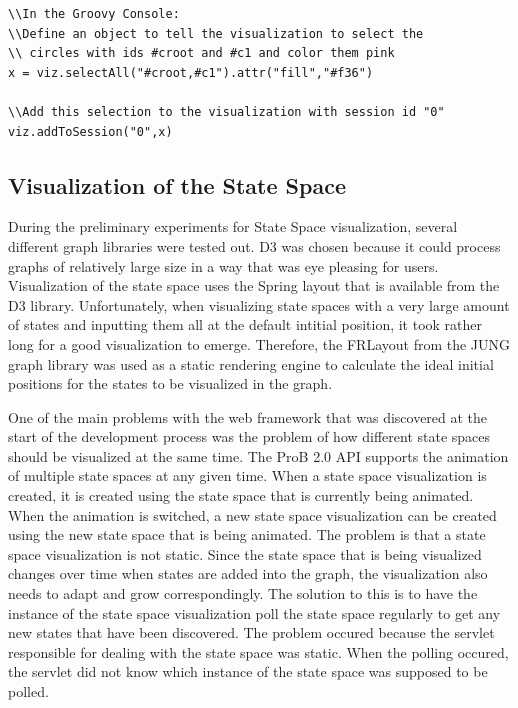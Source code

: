 \begin{verbatim}
\\In the Groovy Console:
\\Define an object to tell the visualization to select the 
\\ circles with ids #croot and #c1 and color them pink
x = viz.selectAll("#croot,#c1").attr("fill","#f36")

\\Add this selection to the visualization with session id "0"
viz.addToSession("0",x)
\end{verbatim}

\subsection{Visualization of the State Space}

During the preliminary experiments for State Space visualization, several different graph libraries were tested out. D3 was chosen because it could process graphs of relatively large size in a way that was eye pleasing for users. Visualization of the state space uses the Spring layout that is available from the D3 library. Unfortunately, when visualizing state spaces with a very large amount of states and inputting them all at the default intitial position, it took rather long for a good visualization to emerge. Therefore, the FRLayout from the JUNG graph library was used as a static rendering engine to calculate the ideal initial positions for the states to be visualized in the graph.

One of the main problems with the web framework that was discovered at the start of the development process was the problem of how different state spaces should be visualized at the same time. The ProB 2.0 API supports the animation of multiple state spaces at any given time. When a state space visualization is created, it is created using the state space that is currently being animated. When the animation is switched, a new state space visualization can be created using the new state space that is being animated. The problem is that a state space visualization is not static. Since the state space that is being visualized changes over time when states are added into the graph, the visualization also needs to adapt and grow correspondingly. The solution to this is to have the instance of the state space visualization poll the state space regularly to get any new states that have been discovered. The problem occured because the servlet responsible for dealing with the state space was static. When the polling occured, the servlet did not know which instance of the state space was supposed to be polled.


